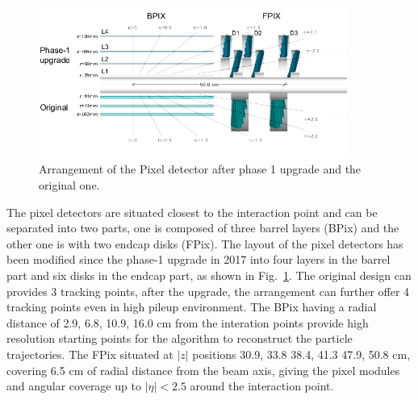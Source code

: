 \begin{figure}[H]\centering
    \includegraphics[width=0.9\textwidth]{figure/cms_pixel.png}
    \caption{Arrangement of the Pixel detector after phase 1 upgrade and the original one.}
    \label{fig:cms_pixel}
\end{figure}

The pixel detectors are situated closest to the interaction point and can be separated into two parts, one is composed of three barrel layers (BPix) and the other one is with two endcap disks (FPix).
The layout of the pixel detectors has been modified since the phase-1 upgrade in 2017 into four layers in the barrel part and six disks in the endcap part, as shown in Fig.~\ref{fig:cms_pixel}.
The original design can provides 3 tracking points, after the upgrade, the arrangement can further offer 4 tracking points even in high pileup environment.
The BPix having a radial distance of 2.9, 6.8, 10.9, 16.0 cm from the interation points provide high resolution starting points for the algorithm to reconstruct the particle trajectories.
The FPix situated at $|z|$ positions 30.9, 33.8 38.4, 41.3 47.9, 50.8 cm, covering 6.5 cm of radial distance from the beam axis, giving the pixel modules and angular coverage up to $|\eta|<2.5$ around the interaction point.

